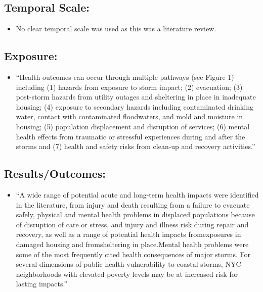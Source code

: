 \documentclass[
]{article}
\providecommand{\tightlist}{%
  \setlength{\itemsep}{0pt}\setlength{\parskip}{0pt}}
\begin{document}
\hypertarget{temporal-scale-9}{%
\subsection{Temporal Scale:}\label{temporal-scale-9}}

\begin{itemize}
\tightlist
\item
  No clear temporal scale was used as this was a literature review.
\end{itemize}

\hypertarget{exposure-8}{%
\subsection{Exposure:}\label{exposure-8}}

\begin{itemize}
\tightlist
\item
  ``Health outcomes can occur through multiple pathways (see Figure 1)
  including (1) hazards from exposure to storm impact; (2) evacuation;
  (3) post-storm hazards from utility outages and sheltering in place in
  inadequate housing; (4) exposure to secondary hazards including
  contaminated drinking water, contact with contaminated floodwaters,
  and mold and moisture in housing; (5) population displacement and
  disruption of services; (6) mental health effects from traumatic or
  stressful experiences during and after the storms and (7) health and
  safety risks from clean-up and recovery activities.''
\end{itemize}

\hypertarget{resultsoutcomes-8}{%
\subsection{Results/Outcomes:}\label{resultsoutcomes-8}}

\begin{itemize}
\tightlist
\item
  ``A wide range of potential acute and long-term health impacts were
  identified in the literature, from injury and death resulting from a
  failure to evacuate safely, physical and mental health problems in
  displaced populations because of disruption of care or stress, and
  injury and illness risk during repair and recovery, as well as a range
  of potential health impacts fromexposures in damaged housing and
  fromsheltering in place.Mental health problems were some of the most
  frequently cited health consequences of major storms. For several
  dimensions of public health vulnerability to coastal storms, NYC
  neighborhoods with elevated poverty levels may be at increased risk
  for lasting impacts.''
\end{itemize}
\end{document}
